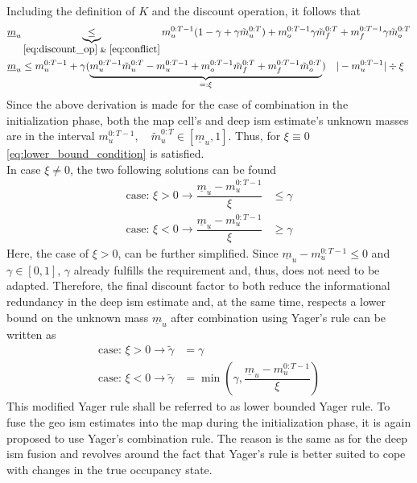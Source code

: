 Including the definition of $K$ and the discount operation, it follows that
\begin{align}
	\underline{m}_u & \underbrace{\leq}_{\eqref{eq:discount_op}\text{ \& }\eqref{eq:conflict}} m_{u}^{0:T-1}(1-\gamma+\gamma\tilde{m}_{u}^{0:T}) + m_{o}^{0:T-1}\gamma\tilde{m}_{f}^{0:T} + m_{f}^{0:T-1}\gamma\tilde{m}_{o}^{0:T}\\
%
	\underline{m}_u &\leq m_{u}^{0:T-1} + \gamma (\underbrace{m_{u}^{0:T-1}\tilde{m}_{u}^{0:T} - m_{u}^{0:T-1} + m_{o}^{0:T-1}\tilde{m}_{f}^{0:T} + m_{f}^{0:T-1}\tilde{m}_{o}^{0:T}}_{=: \xi}) \quad|-m_{u}^{0:T-1} |\div\xi
\end{align}
Since the above derivation is made for the case of combination in the initialization phase, both the map cell's and deep \gls{ism} estimate's unknown masses are in the interval $m_u^{0:T-1},\quad \tilde{m}_u^{0:T}\in[\underline{m}_u,1]$. Thus, for $\xi\equiv 0$ \eqref{eq:lower_bound_condition} is satisfied.\\
In case $\xi \neq 0$, the two following solutions can be found 
\begin{align}
	\text{case: } \xi > 0 \rightarrow \dfrac{\underline{m}_u -m_{u}^{0:T-1}}{\xi} &\leq \gamma\\
	\text{case: } \xi < 0 \rightarrow \dfrac{\underline{m}_u -m_{u}^{0:T-1}}{\xi} &\geq \gamma 
\end{align}
Here, the case of $\xi > 0$, can be further simplified. Since $\underline{m}_u -m_{u}^{0:T-1} \leq 0$ and $\gamma \in [0,1]$, $\gamma$ already fulfills the requirement and, thus, does not need to be adapted. Therefore, the final discount factor to both reduce the informational redundancy in the deep \gls{ism} estimate and, at the same time, respects a lower bound on the unknown mass $\underline{m}_{u}$ after combination using Yager's rule can be written as 
\begin{align}
	\text{case: } \xi > 0 \rightarrow \tilde{\gamma} &= \gamma\\
%
	\text{case: } \xi < 0 \rightarrow \tilde{\gamma} &= \min \left(\gamma, \dfrac{\underline{m}_u -m_{u}^{0:T-1}}{\xi} \right)
\end{align}
This modified Yager rule shall be referred to as lower bounded Yager rule. To fuse the geo \gls{ism} estimates into the map during the initialization phase, it is again proposed to use Yager's combination rule. The reason is the same as for the deep \gls{ism} fusion and revolves around the fact that Yager's rule is better suited to cope with changes in the true occupancy state.
\\\\

